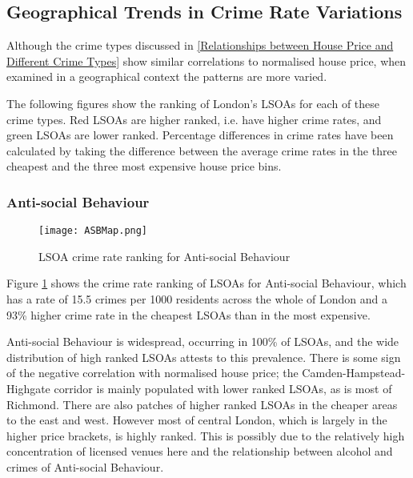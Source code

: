 \documentclass{article}
\begin{document}
\subsection{Geographical Trends in Crime Rate Variations}

Although the crime types discussed in \ref{Relationships between House Price and Different Crime Types} show similar correlations to normalised house price, when examined in a geographical context the patterns are more varied.
\newline 

The following figures show the ranking of London's LSOAs for each of these crime types. Red LSOAs are higher ranked, i.e. have higher crime rates, and green LSOAs are lower ranked. Percentage differences in crime rates have been calculated by taking the difference between the average crime rates in the three cheapest and the three most expensive house price bins.

\subsubsection{Anti-social Behaviour}
\begin{figure}[H]
\begin{center}
  \texttt{[image: ASBMap.png]}
  \caption{LSOA crime rate ranking for Anti-social Behaviour}
  \label{fig:ASBMap}
\end{center}
\end{figure}

Figure \ref{fig:ASBMap} shows the crime rate ranking of LSOAs for Anti-social Behaviour, which has a rate of 15.5 crimes per 1000 residents across the whole of London and a 93\% higher crime rate in the cheapest LSOAs than in the most expensive.
\newline 

Anti-social Behaviour is widespread, occurring in 100\% of LSOAs, and the wide distribution of high ranked LSOAs attests to this prevalence. There is some sign of the negative correlation with normalised house price; the Camden-Hampstead-Highgate corridor is mainly populated with lower ranked LSOAs, as is most of Richmond. There are also patches of higher ranked LSOAs in the cheaper areas to the east and west. However most of central London, which is largely in the higher price brackets, is highly ranked. This is possibly due to the relatively high concentration of licensed venues here and the relationship between alcohol and crimes of Anti-social Behaviour.
\newline
\end{document}
